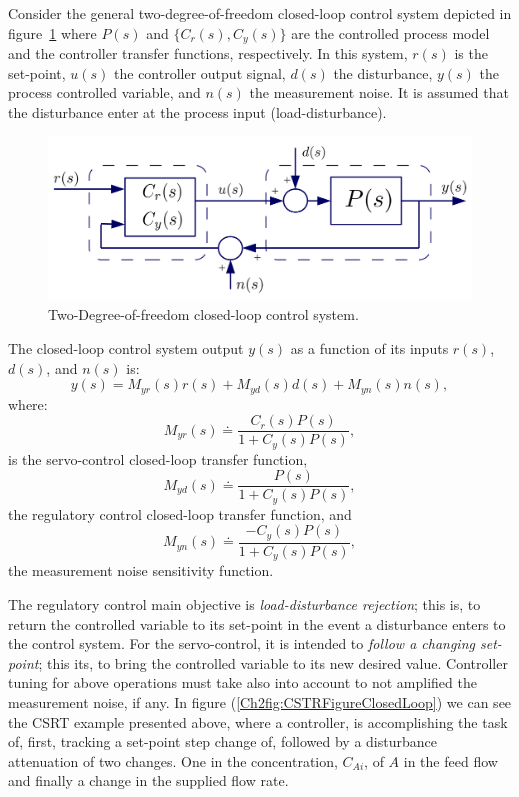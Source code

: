 Consider the general two-degree-of-freedom closed-loop control system depicted in figure~\ref{Ch2fig:DoFControlSystem} where $P(s)$ and $\{C_r(s), C_y(s)\}$ are the controlled process model and the controller transfer functions, respectively.  In this system, $r(s)$ is the set-point, $u(s)$ the controller output signal, $d(s)$ the disturbance, $y(s)$ the process controlled variable, and $n(s)$ the measurement noise. It is assumed that the disturbance enter at the process input (load-disturbance).
%
\begin{figure}[tb]
\centering
	\includegraphics[width=\linewidth]{../figuras/Ch2DoFControlSystem} 
\caption{Two-Degree-of-freedom closed-loop control system.} 
\label{Ch2fig:DoFControlSystem}
\end{figure}

The closed-loop control system output $y(s)$ as a function of its inputs $r(s)$, $d(s)$, and $n(s)$ is:
%
\begin{equation}
	y(s) = M_{yr}(s) r(s) + M_{yd}(s) d(s) + M_{yn}(s) n(s), \label{Ch2eq:yt}
\end{equation}
%
where:
\begin{equation}
	M_{yr}(s) \doteq \frac{C_r(s)P(s)}{1+C_y(s)P(s)}, \label{Ch2eq:myr}
\end{equation}
%
is the servo-control closed-loop transfer function, 
\begin{equation}
	M_{yd}(s) \doteq \frac{P(s)}{1+C_y(s)P(s)}, \label{Ch2eq:myd}
\end{equation}
%
the regulatory control closed-loop transfer function, and
\begin{equation}
	M_{yn}(s) \doteq \frac{-C_y(s)P(s)}{1+C_y(s)P(s)}, \label{Ch2eq:myn}
\end{equation}
%
the measurement noise sensitivity function.

The regulatory control main objective is \emph{load-disturbance rejection}; this is, to return the controlled variable to its set-point in the event a disturbance enters to the control system.  For the servo-control, it is intended to \emph{follow a changing set-point}; this its, to bring the controlled variable to its new desired value. Controller tuning for above operations must take also into account to not amplified the measurement noise, if any.  In figure (\ref{Ch2fig:CSTRFigureClosedLoop}) we can see the CSRT example presented above, where a controller, is accomplishing the task of, first, tracking a set-point step change of, followed by a disturbance attenuation  of two changes. One  in the concentration, $C_{Ai}$, of $A$ in the feed flow and finally a change in the supplied flow rate.

